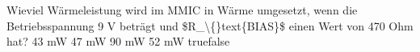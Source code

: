     {Wieviel Wärmeleistung wird im MMIC in Wärme umgesetzt, wenn die Betriebsspannung 9 V beträgt und \$R\_\textbackslash\{\}text\{BIAS\}\$ einen Wert von 470 Ohm hat?}
    {43 mW}
    {47 mW}
    {90 mW}
    {52 mW}
    {true}{false}